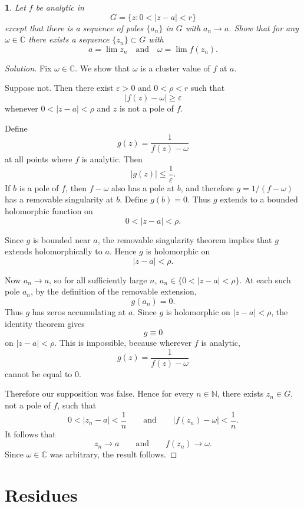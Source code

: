 \documentclass[12pt, a4paper]{report}
\theoremstyle{spaced}
\newtheorem{exercise}{}
\newcommand{\setexercise}[1]{\setcounter{exercise}{#1-1}}
\begin{document}
\setexercise{15}
\begin{exercise}
	Let \( f \) be analytic in
	\[
		G = \{ z : 0 < |z - a| < r \}
	\]
	except that there is a sequence of poles \( \{a_n\} \) in \(G\) with \(a_n \to a\).
	Show that for any \( \omega \in \mathbb{C} \) there exists a sequence \( \{z_n\} \subset G \) with
	\[
		a = \lim z_n \quad \text{and} \quad \omega = \lim f(z_n).
	\]
\end{exercise}


\begin{proof}[Solution]
	Fix \(\omega \in \mathbb C\). We show that \(\omega\) is a cluster value of
	\(f\) at \(a\).

	Suppose not. Then there exist \(\varepsilon>0\) and \(0<\rho<r\) such that
	\[
		|f(z)-\omega|\ge \varepsilon
	\]
	whenever \(0<|z-a|<\rho\) and \(z\) is not a pole of \(f\).

	Define
	\[
		g(z)=\frac{1}{f(z)-\omega}
	\]
	at all points where \(f\) is analytic. Then
	\[
		|g(z)|\le \frac{1}{\varepsilon}.
	\]
	If \(b\) is a pole of \(f\), then \(f-\omega\) also has a pole at \(b\), and
	therefore \(g=1/(f-\omega)\) has a removable singularity at \(b\). Define
	\(g(b)=0\). Thus \(g\) extends to a bounded holomorphic function on
	\[
		0<|z-a|<\rho .
	\]

	Since \(g\) is bounded near \(a\), the removable singularity theorem implies
	that \(g\) extends holomorphically to \(a\). Hence \(g\) is holomorphic on
	\[
		|z-a|<\rho .
	\]

	Now \(a_n\to a\), so for all sufficiently large \(n\), \(a_n\in \{0<|z-a|<\rho\}\).
	At each such pole \(a_n\), by the definition of the removable extension,
	\[
		g(a_n)=0.
	\]
	Thus \(g\) has zeros accumulating at \(a\). Since \(g\) is holomorphic on
	\(|z-a|<\rho\), the identity theorem gives
	\[
		g\equiv 0
	\]
	on \(|z-a|<\rho\). This is impossible, because wherever \(f\) is analytic,
	\[
		g(z)=\frac{1}{f(z)-\omega}
	\]
	cannot be equal to \(0\).

	Therefore our supposition was false. Hence for every \(n\in\mathbb N\), there
	exists \(z_n\in G\), not a pole of \(f\), such that
	\[
		0<|z_n-a|<\frac1n
		\qquad\text{and}\qquad
		|f(z_n)-\omega|<\frac1n.
	\]
	It follows that
	\[
		z_n\to a
		\qquad\text{and}\qquad
		f(z_n)\to \omega .
	\]
	Since \(\omega\in\mathbb C\) was arbitrary, the result follows.
\end{proof}
\section{Residues}
\end{document}
